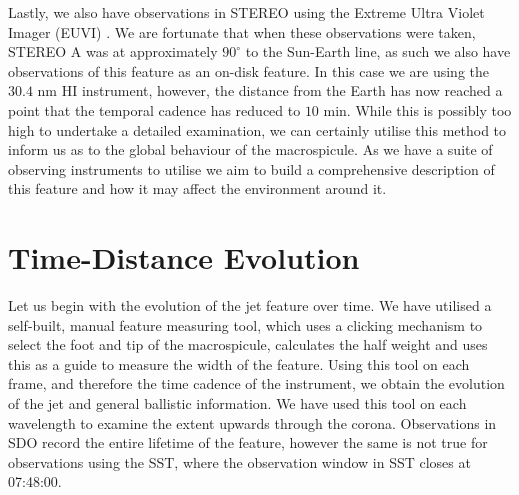 \documentclass{emulateapj}
\begin{document}
Lastly, we also have observations in STEREO using the Extreme Ultra Violet Imager (EUVI) \citep{Defise2001}. 
We are fortunate that when these observations were taken, STEREO A was at approximately $90^\circ$ to the Sun-Earth line, as such we also have observations of this feature as an on-disk feature.
In this case we are using the $30.4$ nm HI instrument, however, the distance from the Earth has now reached a point that the temporal cadence has reduced to $10$ min.
While this is possibly too high to undertake a detailed examination, we can certainly utilise this method to inform us as to the global behaviour of the macrospicule.
As we have a suite of observing instruments to utilise we aim to build a comprehensive description of this feature and how it may affect the environment around it.


\section{Time-Distance Evolution}
\label{time_dist_sect}

Let us begin with the evolution of the jet feature over time. 
We have utilised a self-built, manual feature measuring tool, which uses a clicking mechanism to select the foot and tip of the macrospicule, calculates the half weight and uses this as a guide to measure the width of the feature.
Using this tool on each frame, and therefore the time cadence of the instrument, we obtain the evolution of the jet and general ballistic information.
We have used this tool on each wavelength to examine the extent upwards through the corona. 
Observations in SDO record the entire lifetime of the feature, however the same is not true for observations using the SST, where the observation window in SST closes at 07:48:00.
\end{document}
